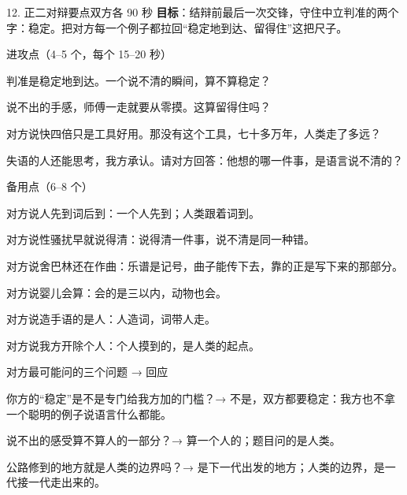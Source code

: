 \documentclass[script,pro]{debate}
\begin{document}
\begin{stage}{12. 正二对辩要点}{双方各 90 秒}
\textbf{目标}：结辩前最后一次交锋，守住中立判准的两个字：稳定。把对方每一个例子都拉回“稳定地到达、留得住”这把尺子。
\begin{points}{进攻点（4–5 个，每个 15–20 秒）}
\item 判准是稳定地到达。一个说不清的瞬间，算不算稳定？
\item 说不出的手感，师傅一走就要从零摸。这算留得住吗？
\item 对方说快四倍只是工具好用。那没有这个工具，七十多万年，人类走了多远？
\item 失语的人还能思考，我方承认。请对方回答：他想的哪一件事，是语言说不清的？
\end{points}
\begin{points}{备用点（6–8 个）}
\item 对方说人先到词后到：一个人先到；人类跟着词到。
\item 对方说性骚扰早就说得清：说得清一件事，说不清是同一种错。
\item 对方说舍巴林还在作曲：乐谱是记号，曲子能传下去，靠的正是写下来的那部分。
\item 对方说婴儿会算：会的是三以内，动物也会。
\item 对方说造手语的是人：人造词，词带人走。
\item 对方说我方开除个人：个人摸到的，是人类的起点。
\end{points}
\begin{points}{对方最可能问的三个问题 → 回应}
\item 你方的“稳定”是不是专门给我方加的门槛？→ 不是，双方都要稳定：我方也不拿一个聪明的例子说语言什么都能。
\item 说不出的感受算不算人的一部分？→ 算一个人的；题目问的是人类。
\item 公路修到的地方就是人类的边界吗？→ 是下一代出发的地方；人类的边界，是一代接一代走出来的。
\end{points}
\end{stage}
\end{document}
